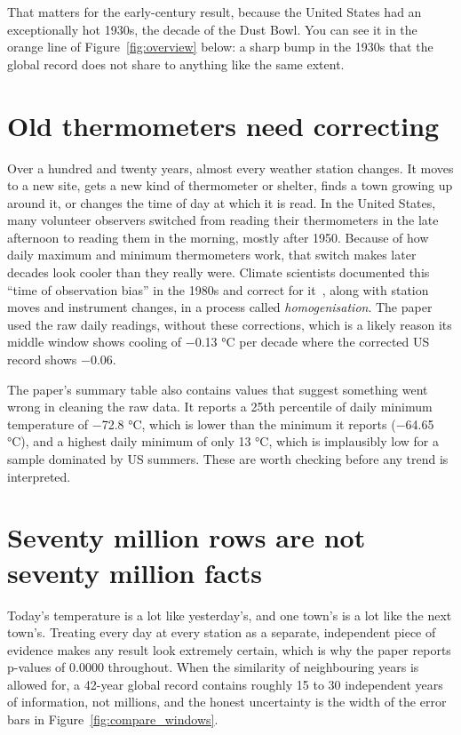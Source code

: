 That matters for the early-century result, because the United States had an exceptionally hot 1930s, the decade of the Dust Bowl. You can see it in the orange line of Figure~\ref{fig:overview} below: a sharp bump in the 1930s that the global record does not share to anything like the same extent.

\section{Old thermometers need correcting}

Over a hundred and twenty years, almost every weather station changes. It moves to a new site, gets a new kind of thermometer or shelter, finds a town growing up around it, or changes the time of day at which it is read. In the United States, many volunteer observers switched from reading their thermometers in the late afternoon to reading them in the morning, mostly after 1950. Because of how daily maximum and minimum thermometers work, that switch makes later decades look cooler than they really were. Climate scientists documented this ``time of observation bias'' in the 1980s and correct for it~\citep{karl1986}, along with station moves and instrument changes, in a process called \emph{homogenisation}. The paper used the raw daily readings, without these corrections, which is a likely reason its middle window shows cooling of −0.13 °C per decade where the corrected US record shows −0.06.

The paper's summary table also contains values that suggest something went wrong in cleaning the raw data. It reports a 25th percentile of daily minimum temperature of −72.8 °C, which is lower than the minimum it reports (−64.65 °C), and a highest daily minimum of only 13 °C, which is implausibly low for a sample dominated by US summers. These are worth checking before any trend is interpreted.

\section{Seventy million rows are not seventy million facts}

Today's temperature is a lot like yesterday's, and one town's is a lot like the next town's. Treating every day at every station as a separate, independent piece of evidence makes any result look extremely certain, which is why the paper reports p-values of 0.0000 throughout. When the similarity of neighbouring years is allowed for, a 42-year global record contains roughly 15 to 30 independent years of information, not millions, and the honest uncertainty is the width of the error bars in Figure~\ref{fig:compare_windows}.
